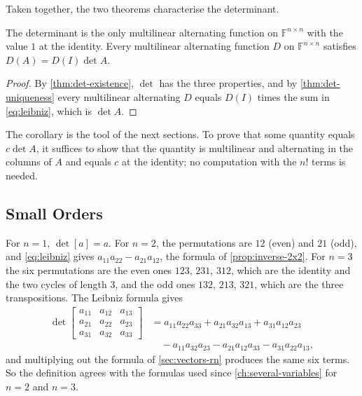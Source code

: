 Taken together, the two theorems characterise the determinant.

\begin{corollary}
\label{cor:det-characterisation}
The determinant is the only multilinear alternating function on $\mathbb F^{n\times n}$ with the value $1$ at the identity. Every multilinear alternating function $D$ on $\mathbb F^{n\times n}$ satisfies $D(A)=D(I)\det A$.
\end{corollary}

\begin{proof}
By \cref{thm:det-existence}, $\det$ has the three properties, and by \cref{thm:det-uniqueness} every multilinear alternating $D$ equals $D(I)$ times the sum in \eqref{eq:leibniz}, which is $\det A$.
\end{proof}

The corollary is the tool of the next sections. To prove that some quantity equals $c\det A$, it suffices to show that the quantity is multilinear and alternating in the columns of $A$ and equals $c$ at the identity; no computation with the $n!$ terms is needed.

\subsection{Small Orders}

For $n=1$, $\det[a]=a$. For $n=2$, the permutations are $12$ (even) and $21$ (odd), and \eqref{eq:leibniz} gives $a_{11}a_{22}-a_{21}a_{12}$, the formula of \cref{prop:inverse-2x2}. For $n=3$ the six permutations are the even ones $123$, $231$, $312$, which are the identity and the two cycles of length $3$, and the odd ones $132$, $213$, $321$, which are the three transpositions. The Leibniz formula gives
\begin{equation}
\begin{aligned}
\det\begin{bmatrix}a_{11}&a_{12}&a_{13}\\a_{21}&a_{22}&a_{23}\\a_{31}&a_{32}&a_{33}\end{bmatrix}
&=a_{11}a_{22}a_{33}+a_{21}a_{32}a_{13}+a_{31}a_{12}a_{23}\\
&\quad-a_{11}a_{32}a_{23}-a_{21}a_{12}a_{33}-a_{31}a_{22}a_{13},
\end{aligned}
\label{eq:det3}
\end{equation}
and multiplying out the formula of \cref{sec:vectors-rn} produces the same six terms. So the definition agrees with the formulas used since \cref{ch:several-variables} for $n=2$ and $n=3$.

